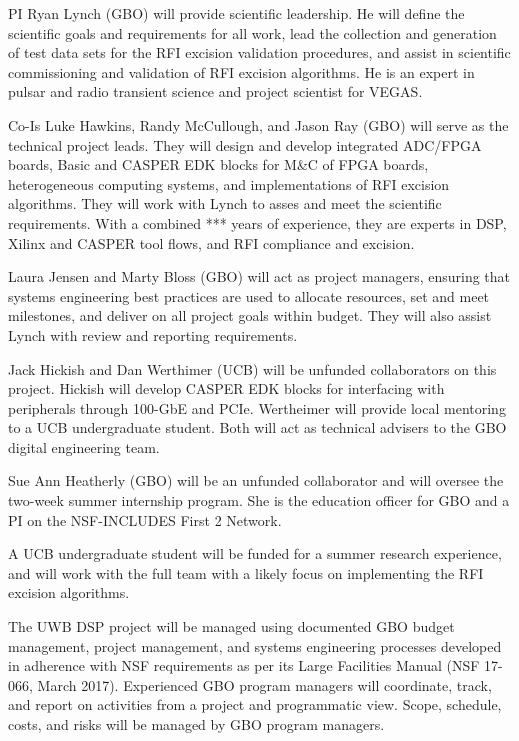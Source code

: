 \documentclass[10pt]{myNSF}
\begin{document}
\begin{itemize*}
\item{PI Ryan Lynch (GBO) will provide scientific leadership.  He will
  define the scientific goals and requirements for all work, lead the
  collection and generation of test data sets for the RFI excision
  validation procedures, and assist in scientific commissioning and
  validation of RFI excision algorithms.  He is an expert in pulsar
  and radio transient science and project scientist for VEGAS.}
\item{Co-Is Luke Hawkins, Randy McCullough, and Jason Ray (GBO) will
  serve as the technical project leads.  They will design and develop
  integrated ADC/FPGA boards, Basic and CASPER EDK blocks for M\&C of
  FPGA boards, heterogeneous computing systems, and implementations of
  RFI excision algorithms.  They will work with Lynch to asses and
  meet the scientific requirements.  With a combined *** years of
  experience, they are experts in DSP, Xilinx and CASPER tool flows,
  and RFI compliance and excision.}
\item{Laura Jensen and Marty Bloss (GBO) will act as project managers,
  ensuring that systems engineering best practices are used to
  allocate resources, set and meet milestones, and deliver on all
  project goals within budget.  They will also assist Lynch with
  review and reporting requirements.}
\item{Jack Hickish and Dan Werthimer (UCB) will be unfunded
  collaborators on this project.  Hickish will develop CASPER EDK
  blocks for interfacing with peripherals through 100-GbE and PCIe.
  Wertheimer will provide local mentoring to a UCB undergraduate
  student.  Both will act as technical advisers to the GBO digital
  engineering team.}
\item{Sue Ann Heatherly (GBO) will be an unfunded collaborator and
  will oversee the two-week summer internship program.  She is the
  education officer for GBO and a PI on the NSF-INCLUDES First 2
  Network.}
\item{A UCB undergraduate student will be funded for a summer research
  experience, and will work with the full team with a likely focus on
  implementing the RFI excision algorithms.}
\end{itemize*}
  
\label{sec:organization}

The UWB DSP project will be managed using documented GBO budget
management, project management, and systems engineering processes
developed in adherence with NSF requirements as per its Large
Facilities Manual (NSF 17-066, March 2017). Experienced GBO program
managers will coordinate, track, and report on activities from a
project and programmatic view.  Scope, schedule, costs, and risks will
be managed by GBO program managers.
\end{document}

